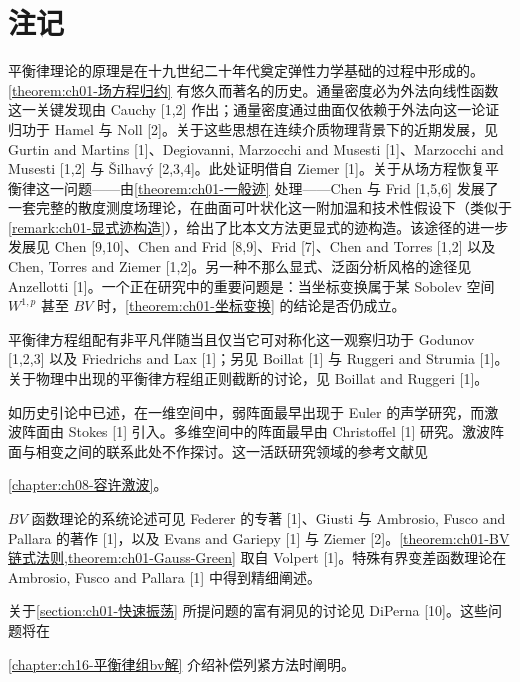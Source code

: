 \documentclass[../../main.tex]{subfiles}
\begin{document}
\section{注记}\label{section:ch01-注记}

平衡律理论的原理是在十九世纪二十年代奠定弹性力学基础的过程中形成的。\cref{theorem:ch01-场方程归约} 有悠久而著名的历史。通量密度必为外法向线性函数这一关键发现由 Cauchy [1,2] 作出；通量密度通过曲面仅依赖于外法向这一论证归功于 Hamel 与 Noll [2]。关于这些思想在连续介质物理背景下的近期发展，见 Gurtin and Martins [1]、Degiovanni, Marzocchi and Musesti [1]、Marzocchi and Musesti [1,2] 与 Šilhavý [2,3,4]。此处证明借自 Ziemer [1]。关于从场方程恢复平衡律这一问题——由\cref{theorem:ch01-一般迹} 处理——Chen 与 Frid [1,5,6] 发展了一套完整的散度测度场理论，在曲面可叶状化这一附加温和技术性假设下（类似于\cref{remark:ch01-显式迹构造}），给出了比本文方法更显式的迹构造。该途径的进一步发展见 Chen [9,10]、Chen and Frid [8,9]、Frid [7]、Chen and Torres [1,2] 以及 Chen, Torres and Ziemer [1,2]。另一种不那么显式、泛函分析风格的途径见 Anzellotti [1]。一个正在研究中的重要问题是：当坐标变换属于某 Sobolev 空间 $W^{1,p}$ 甚至 $BV$ 时，\cref{theorem:ch01-坐标变换} 的结论是否仍成立。

平衡律方程组配有非平凡伴随当且仅当它可对称化这一观察归功于 Godunov [1,2,3] 以及 Friedrichs and Lax [1]；另见 Boillat [1] 与 Ruggeri and Strumia [1]。关于物理中出现的平衡律方程组正则截断的讨论，见 Boillat and Ruggeri [1]。

如历史引论中已述，在一维空间中，弱阵面最早出现于 Euler 的声学研究，而激波阵面由 Stokes [1] 引入。多维空间中的阵面最早由 Christoffel [1] 研究。激波阵面与相变之间的联系此处不作探讨。这一活跃研究领域的参考文献见%

\cref{chapter:ch08-容许激波}。

$BV$ 函数理论的系统论述可见 Federer 的专著 [1]、Giusti 与 Ambrosio, Fusco and Pallara 的著作 [1]，以及 Evans and Gariepy [1] 与 Ziemer [2]。\cref{theorem:ch01-BV链式法则,theorem:ch01-Gauss-Green} 取自 Volpert [1]。特殊有界变差函数理论在 Ambrosio, Fusco and Pallara [1] 中得到精细阐述。

关于\cref{section:ch01-快速振荡} 所提问题的富有洞见的讨论见 DiPerna [10]。这些问题将在%

\cref{chapter:ch16-平衡律组bv解} 介绍补偿列紧方法时阐明。
\end{document}
